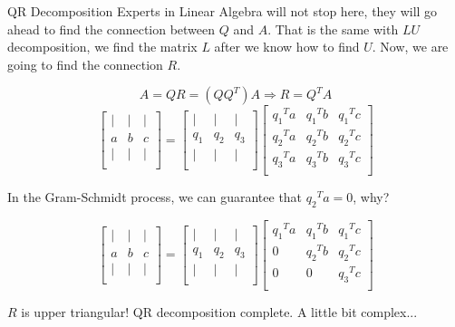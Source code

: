 \documentclass{beamer}
\begin{document}
\begin{frame}{QR Decomposition}
Experts in Linear Algebra will not stop here, they will go ahead to find the connection between $Q$ and $A$. That is the same with $LU$ decomposition, we find the matrix $L$ after we know how to find $U$. Now, we are going to find the connection $R$.

\begin{equation*}
    A=QR=\left( QQ^T \right) A\Rightarrow R=Q^TA
\end{equation*}
\begin{equation*}
    \left[ \begin{matrix}
        |&		|&		|\\
        a&		b&		c\\
        |&		|&		|\\
    \end{matrix} \right] =\left[ \begin{matrix}
        |&		|&		|\\
        q_1&		q_2&		q_3\\
        |&		|&		|\\
    \end{matrix} \right] \left[ \begin{matrix}
        {q_1}^Ta&		{q_1}^Tb&		{q_1}^Tc\\
        {q_2}^Ta&		{q_2}^Tb&		{q_2}^Tc\\
        {q_3}^Ta&		{q_3}^Tb&		{q_3}^Tc\\
    \end{matrix} \right]
\end{equation*}

In the Gram-Schmidt process, we can guarantee that ${q_2}^Ta=0$, why?

\begin{equation*}
    \left[ \begin{matrix}
        |&		|&		|\\
        a&		b&		c\\
        |&		|&		|\\
    \end{matrix} \right] =\left[ \begin{matrix}
        |&		|&		|\\
        q_1&		q_2&		q_3\\
        |&		|&		|\\
    \end{matrix} \right] \left[ \begin{matrix}
        {q_1}^Ta&		{q_1}^Tb&		{q_1}^Tc\\
        0&		{q_2}^Tb&		{q_2}^Tc\\
        0&		0&		{q_3}^Tc\\
    \end{matrix} \right]
\end{equation*}

$R$ is upper triangular! QR decomposition complete. A little bit complex...
\end{frame}
\end{document}
